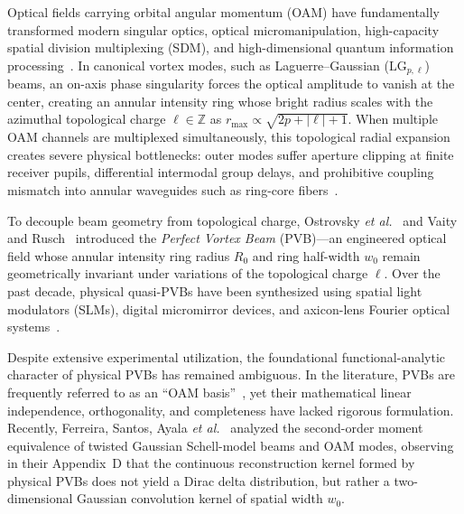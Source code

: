 \documentclass[11pt,a4paper]{article}
\begin{document}
Optical fields carrying orbital angular momentum (OAM) have fundamentally transformed modern singular optics, optical micromanipulation, high-capacity spatial division multiplexing (SDM), and high-dimensional quantum information processing~\cite{Allen1992,Durnin1987,Mair2001,Dennis2009,FrankeArnold2008,Berry1998,Berry2004,Barnett2002,Padgett1999,Gbur2016,MandelWolf1995,Siegman1986}. In canonical vortex modes, such as Laguerre--Gaussian ($\text{LG}_{p, \ell}$) beams, an on-axis phase singularity forces the optical amplitude to vanish at the center, creating an annular intensity ring whose bright radius scales with the azimuthal topological charge $\ell \in \mathbb{Z}$ as $r_{\max} \propto \sqrt{2p + |\ell| + 1}$. When multiple OAM channels are multiplexed simultaneously, this topological radial expansion creates severe physical bottlenecks: outer modes suffer aperture clipping at finite receiver pupils, differential intermodal group delays, and prohibitive coupling mismatch into annular waveguides such as ring-core fibers~\cite{Villalba2023,RojasRojas2021,Canas2021,Ramachandran2009,Bozinovic2013,Willner2015,Brunet2014,Gregg2015,Zhu2018,Wang2012}.

To decouple beam geometry from topological charge, Ostrovsky \emph{et al.}~\cite{Ostrovsky2013} and Vaity and Rusch~\cite{Vaity2015} introduced the \emph{Perfect Vortex Beam} (PVB)---an engineered optical field whose annular intensity ring radius $R_0$ and ring half-width $w_0$ remain geometrically invariant under variations of the topological charge $\ell$. Over the past decade, physical quasi-PVBs have been synthesized using spatial light modulators (SLMs), digital micromirror devices, and axicon-lens Fourier optical systems~\cite{Chen2013,Reddy2016,Jabir2016,GarciaGarcia2014,Li2018PVB,PerezGarcia2017,Arrizon2007}.

Despite extensive experimental utilization, the foundational functional-analytic character of physical PVBs has remained ambiguous. In the literature, PVBs are frequently referred to as an ``OAM basis''~\cite{GarciaEscartin2008}, yet their mathematical linear independence, orthogonality, and completeness have lacked rigorous formulation. Recently, Ferreira, Santos, Ayala \emph{et al.}~\cite{Ferreira2026} analyzed the second-order moment equivalence of twisted Gaussian Schell-model beams and OAM modes, observing in their Appendix~D that the continuous reconstruction kernel formed by physical PVBs does not yield a Dirac delta distribution, but rather a two-dimensional Gaussian convolution kernel of spatial width $w_0$.
\end{document}
